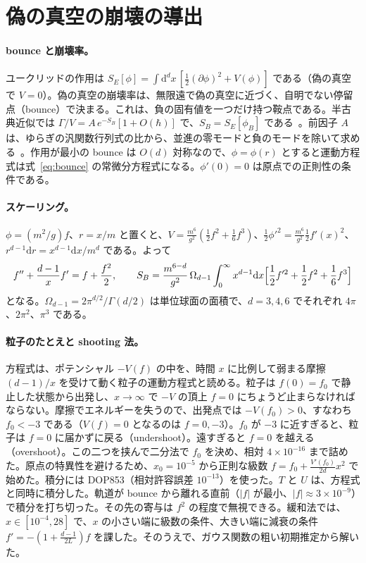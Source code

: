 \documentclass[a4paper,10pt]{ltjsarticle}
\newcommand{\dd}{\mathrm{d}}
\begin{document}
\section{偽の真空の崩壊の導出}\label{app:bounce}

\paragraph{bounce と崩壊率。}ユークリッドの作用は $S_E[\phi]=\int\dd^dx\,[\frac12(\partial\phi)^2+V(\phi)]$ である（偽の真空で $V=0$）。偽の真空の崩壊率は、無限遠で偽の真空に近づく、自明でない停留点（bounce）で決まる。これは、負の固有値を一つだけ持つ鞍点である。半古典近似では $\Gamma/V=A\,e^{-S_B}[1+O(\hbar)]$ で、$S_B=S_E[\phi_B]$ である~\cite{coleman}。前因子 $A$ は、ゆらぎの汎関数行列式の比から、並進の零モードと負のモードを除いて求める~\cite{callancoleman}。作用が最小の bounce は $O(d)$ 対称なので、$\phi=\phi(r)$ とすると運動方程式は式~\eqref{eq:bounce} の常微分方程式になる。$\phi'(0)=0$ は原点での正則性の条件である。

\paragraph{スケーリング。}$\phi=(m^2/g)f$、$r=x/m$ と置くと、$V=\frac{m^6}{g^2}(\frac12f^2+\frac16f^3)$、$\frac12\phi'^2=\frac{m^6}{g^2}\frac12f'(x)^2$、$r^{d-1}\dd r=x^{d-1}\dd x/m^d$ である。よって
\begin{equation*}
f''+\frac{d-1}{x}f'=f+\frac{f^2}{2},\qquad
S_B=\frac{m^{6-d}}{g^2}\,\Omega_{d-1}\int_0^\infty x^{d-1}\dd x\Bigl[\frac12f'^2+\frac12f^2+\frac16f^3\Bigr]
\end{equation*}
となる。$\Omega_{d-1}=2\pi^{d/2}/\Gamma(d/2)$ は単位球面の面積で、$d=3,4,6$ でそれぞれ $4\pi$、$2\pi^2$、$\pi^3$ である。

\paragraph{粒子のたとえと shooting 法。}方程式は、ポテンシャル $-V(f)$ の中を、時間 $x$ に比例して弱まる摩擦 $(d-1)/x$ を受けて動く粒子の運動方程式と読める。粒子は $f(0)=f_0$ で静止した状態から出発し、$x\to\infty$ で $-V$ の頂上 $f=0$ にちょうど止まらなければならない。摩擦でエネルギーを失うので、出発点では $-V(f_0)>0$、すなわち $f_0<-3$ である（$V(f)=0$ となるのは $f=0,-3$）。$f_0$ が $-3$ に近すぎると、粒子は $f=0$ に届かずに戻る（undershoot）。遠すぎると $f=0$ を越える（overshoot）。この二つを挟んで二分法で $f_0$ を決め、相対 $4\times10^{-16}$ まで詰めた。原点の特異性を避けるため、$x_0=10^{-5}$ から正則な級数 $f=f_0+\frac{V'(f_0)}{2d}x^2$ で始めた。積分には DOP853（相対許容誤差 $10^{-13}$）を使った。$T$ と $U$ は、方程式と同時に積分した。軌道が bounce から離れる直前（$|f|$ が最小、$|f|\approx3\times10^{-9}$）で積分を打ち切った。その先の寄与は $f^2$ の程度で無視できる。緩和法では、$x\in[10^{-4},28]$ で、$x$ の小さい端に級数の条件、大きい端に減衰の条件 $f'=-(1+\frac{d-1}{2L})f$ を課した。そのうえで、ガウス関数の粗い初期推定から解いた。
\end{document}
